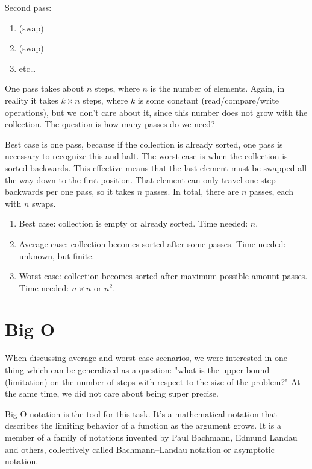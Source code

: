 \documentclass[a4paper, justified, notitlepage, sfsidenotes, notoc]{tufte-book}
\begin{document}
Second pass:

\begin{enumerate}
\item\relax [ \textbf{3, 1}, 2, 5, 6, 4, 7, 8, 9 ] (swap)
\item\relax [ 1, \textbf{3, 2}, 5, 6, 4, 7, 8, 9 ] (swap)
\item etc\ldots{}
\end{enumerate}

One pass takes about \(n\) steps, where \(n\) is the number of elements. Again, in reality it takes \(k \times n\) steps, where \(k\) is some constant (read/compare/write operations), but we don't care about it, since this number does not grow with the collection. The question is how many passes do we need?

Best case is one pass, because if the collection is already sorted, one pass is necessary to recognize this and halt. The worst case is when the collection is sorted backwards. This effective means that the last element must be swapped all the way down to the first position. That element can only travel one step backwards per one pass, so it takes \(n\) passes. In total, there are \(n\) passes, each with \(n\) swaps.

\begin{enumerate}
\item Best case: collection is empty or already sorted. Time needed: \(n\).
\item Average case: collection becomes sorted after some passes. Time needed: unknown, but finite.
\item Worst case: collection becomes sorted after maximum possible amount passes. Time needed: \(n \times n\) or \(n^{2}\).
\end{enumerate}

\chapter{Big O}
\label{sec:org4c3be2d}

When discussing average and worst case scenarios, we were interested in one thing which can be generalized as a question: "what is the upper bound (limitation) on the number of steps with respect to the size of the problem?" At the same time, we did not care about being super precise.

Big O notation is the tool for this task. It's a mathematical notation that describes the limiting behavior of a function as the argument grows. It is a member of a family of notations invented by Paul Bachmann, Edmund Landau and others, collectively called Bachmann–Landau notation or asymptotic notation.
\end{document}
